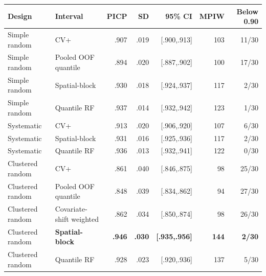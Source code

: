 \begin{tabular}{llrrrrr}
\toprule
Design & Interval & PICP & SD & 95\% CI & MPIW & Below 0.90 \\
\midrule
Simple random & CV+ & .907 & .019 & [.900,.913] & 103 & 11/30 \\
Simple random & Pooled OOF quantile & .894 & .020 & [.887,.902] & 100 & 17/30 \\
Simple random & Spatial-block & .930 & .018 & [.924,.937] & 117 & 2/30 \\
Simple random & Quantile RF & .937 & .014 & [.932,.942] & 123 & 1/30 \\
\midrule
Systematic & CV+ & .913 & .020 & [.906,.920] & 107 & 6/30 \\
Systematic & Spatial-block & .931 & .016 & [.925,.936] & 117 & 2/30 \\
Systematic & Quantile RF & .936 & .013 & [.932,.941] & 122 & 0/30 \\
\midrule
Clustered random & CV+ & .861 & .040 & [.846,.875] & 98 & 25/30 \\
Clustered random & Pooled OOF quantile & .848 & .039 & [.834,.862] & 94 & 27/30 \\
Clustered random & Covariate-shift weighted & .862 & .034 & [.850,.874] & 98 & 26/30 \\
Clustered random & \textbf{Spatial-block} & \textbf{.946} & \textbf{.030} & \textbf{[.935,.956]} & \textbf{144} & \textbf{2/30} \\
Clustered random & Quantile RF & .928 & .023 & [.920,.936] & 137 & 5/30 \\
\bottomrule
\end{tabular}

